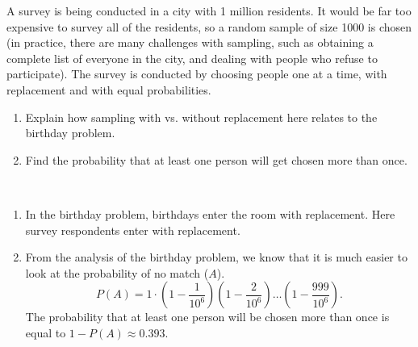 
\setcounter{theorem}{14}
\begin{exercise}[BH.1.26]
	A survey is being conducted in a city with 1 million residents. It would be far too expensive to survey all of the residents, so a random sample of size 1000 is chosen (in practice, there are many challenges with sampling, such as obtaining a complete list of everyone in the city, and dealing with people who refuse to participate). The survey is conducted by choosing people one at a time, with replacement and with equal probabilities.
	\begin{enumerate}
		\item Explain how sampling with vs. without replacement here relates to the birthday problem.
		\item Find the probability that at least one person will get chosen more than once.
	\end{enumerate}
\begin{solution}~
	\begin{enumerate}
		\item In the birthday problem, birthdays enter the room with replacement. Here survey respondents enter with replacement.
		\item From the analysis of the birthday problem, we know that it is much easier to look at the probability of no match ($A$).
		$$P(A) = 1\cdot \left(1-\frac{1}{10^6}\right)\left(1-\frac{2}{10^6}\right)\ldots \left(1-\frac{999}{10^6}\right).$$
		The probability that at least one person will be chosen more than once is equal to $1-P(A) \approx 0.393$.
	\end{enumerate}
\end{solution}
\end{exercise}


